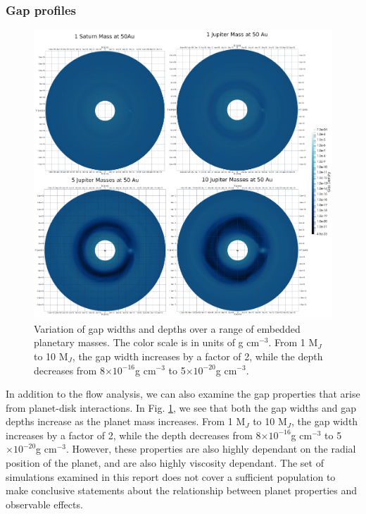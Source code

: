 \documentclass[preprint2]{aastex62}
\begin{document}
\subsubsection{Gap profiles}
\begin{figure}
	\centering
	\includegraphics[width=0.85\linewidth]{figures/Presentation/Gaps/Gaps.png}
	\caption{\label{fig:gaps}Variation of gap widths and depths over a range of embedded planetary masses. The color scale is in units of g cm$^{-3}$. From 1 M$_{J}$ to 10 M$_{J}$, the gap width increases by a factor of 2, while the depth decreases from 8$\times10^{-16}$g cm$^{-3}$ to 5$\times10^{-20}$g cm$^{-3}$.}
\end{figure}
In addition to the flow analysis, we can also examine the gap properties that arise from planet-disk interactions. 
In Fig. \ref{fig:gaps}, we see that both the gap widths and gap depths increase as the planet mass increases. From 1 M$_{J}$ to 10 M$_{J}$, the gap width increases by a factor of 2, while the depth decreases from 8$\times10^{-16}$g cm$^{-3}$ to 5$\times10^{-20}$g cm$^{-3}$. However, these properties are also highly dependant on the radial position of the planet, and are also highly viscosity dependant. The set of simulations examined in this report does not cover a sufficient population to make conclusive statements about the relationship between planet properties and observable effects.
\end{document}
